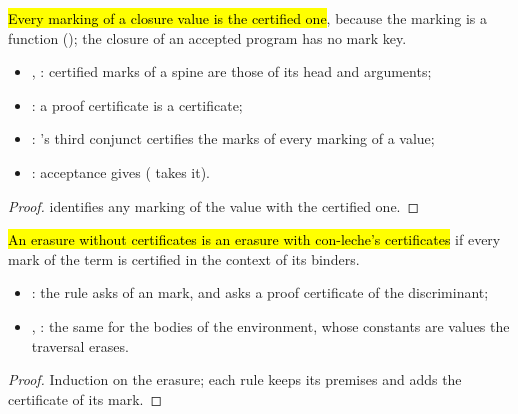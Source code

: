 \begin{lemma}
  \label{lem:EraseProof-Final-marksCert_of_progCert}
  \leanok
   \hl{Every marking of a closure value is the certified one}, because the marking is a function (); the closure of an accepted program has no mark key.
  \begin{itemize}
  \item {}, : certified marks of a spine are those of its head and arguments;
  \item {}: a proof certificate is a certificate;
  \item {}: 's third conjunct certifies the marks of every marking of a value;
  \item {}: acceptance gives  ( takes it).
  \end{itemize}
\end{lemma}
\begin{proof}
  \leanok
    identifies any marking of the value with the certified one.
\end{proof}

\begin{lemma}
  \label{lem:EraseProof-Final-Erases-toCert}
  \leanok
   \hl{An erasure without certificates is an erasure with con-leche's certificates} if every mark of the term is certified in the context of its binders.
  \begin{itemize}
  \item {}: the  rule asks  of an  mark, and  asks a proof certificate of the discriminant;
  \item {}, : the same for the bodies of the environment, whose constants are values the traversal erases.
  \end{itemize}
\end{lemma}
\begin{proof}
  \leanok
   Induction on the erasure; each rule keeps its premises and adds the certificate of its mark.
\end{proof}


